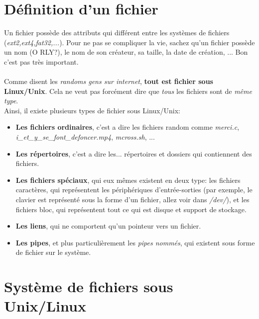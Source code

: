 \documentclass{report}
\begin{document}
\section{Définition d'un fichier}
Un fichier possède des attributs qui différent entre les systèmes de fichiers (\emph{ext2,ext4,fat32,...}). Pour ne pas se compliquer la vie, sachez qu'un fichier possède un nom (O RLY?), le nom de son créateur, sa taille, la date de création, ... Bon c'est pas très important.
\paragraph{}
Comme disent les \emph{randoms gens sur internet}, \textbf{tout est fichier sous Linux/Unix}. Cela ne veut pas forcément dire que \emph{tous} les fichiers sont de \emph{même type}.\\
Ainsi, il existe plusieurs types de fichier sous Linux/Unix:
\begin{itemize}
\item{\textbf{Les fichiers ordinaires}, c'est a dire les fichiers random comme \emph{merci.c}, \emph{i\_et\_y\_se\_font\_defoncer.mp4}, \emph{mcross.sh}, ...}
\item{\textbf{Les répertoires}, c'est a dire les... répertoires et dossiers qui contiennent des fichiers.}
\item{\textbf{Les fichiers spéciaux}, qui eux mêmes existent en deux type: les fichiers caractères, qui représentent les périphériques d'entrée-sorties (par exemple, le  clavier est représenté sous la forme d'un fichier, allez voir dans \emph{/dev/}), et les fichiers bloc, qui représentent tout ce qui est disque et support de stockage.}
\item{\textbf{Les liens}, qui ne comportent qu'un pointeur vers un fichier.}
\item{\textbf{Les pipes}, et plus particulièrement les \emph{pipes nommés}, qui existent sous forme de fichier sur le système.}
\end{itemize}

\section{Système de fichiers sous Unix/Linux}
\end{document}
